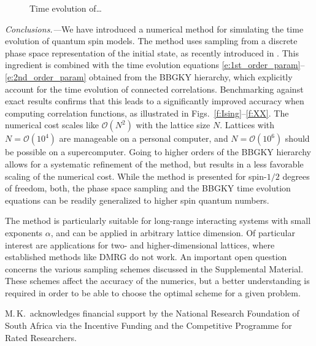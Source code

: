 \documentclass[aps,prl,showpacs,amsmath,amssymb,superscriptaddress,reprint,10pt]{revtex4-1}
\begin{document}
\begin{figure}\centering
\caption{\label{f:2d}%
Time evolution of\dots
}%
\end{figure}


{\em Conclusions.---}We have introduced a numerical method for simulating the time evolution of quantum spin models. The method uses sampling from a discrete phase space representation of the initial state, as recently introduced in \cite{Schachenmayer_etal15}. This ingredient is combined with the time evolution equations \eqref{e:1st_order_param}--\eqref{e:2nd_order_param} obtained from the BBGKY hierarchy, which explicitly account for the time evolution of connected correlations. Benchmarking against exact results confirms that this leads to a significantly improved accuracy when computing correlation functions, as illustrated in Figs.~\ref{f:Ising}--\ref{f:XX}. The numerical cost scales like $\mathscr{O}(N^2)$ with the lattice size $N$. Lattices with $N=\mathscr{O}(10^4)$ are manageable on a personal computer, and $N=\mathscr{O}(10^6)$ should be possible on a supercomputer. Going to higher orders of the BBGKY hierarchy allows for a systematic refinement of the method, but results in a less favorable 
scaling of the numerical cost. While 
the method is presented for spin-$1/2$ degrees of freedom, both, the phase space sampling and the BBGKY time evolution equations can be readily generalized to higher spin quantum numbers.

The method is particularly suitable for long-range interacting systems with small exponents $\alpha$, and can be applied in arbitrary lattice dimension. Of particular interest are applications for two- and higher-dimensional lattices, where established methods like DMRG do not work. An important open question concerns the various sampling schemes discussed in the Supplemental Material. These schemes affect the accuracy of the numerics, but a better understanding is required in order to be able to choose the optimal scheme for a given problem.




M.\,K.\ acknowledges financial support by the National Research Foundation of South Africa via the Incentive Funding and the Competitive Programme for Rated Researchers.




\bigskip
\end{document}
